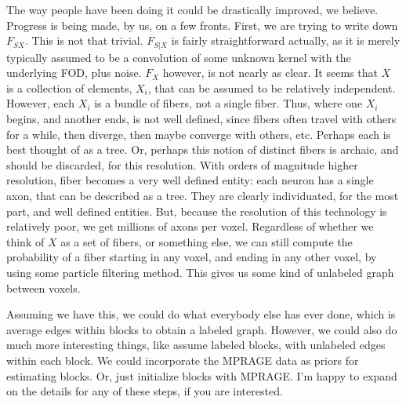 The way people have been doing it could be drastically improved, we believe.  Progress is being made, by us, on a few fronts.  First, we are trying to write down $F_{SX}$.  This is not that trivial.  $F_{S|X}$ is fairly straightforward actually, as it is merely typically assumed to be a convolution of some unknown kernel with the underlying FOD, plus noise.  $F_X$ however, is not nearly as clear.  It seems that $X$ is a collection of elements, $X_i$, that can be assumed to be relatively independent.  However, each $X_i$ is a bundle of fibers, not a single fiber.  Thus, where one $X_i$ begins, and another ends, is not well defined, since fibers often travel with others for a while, then diverge, then maybe converge with others, etc.  Perhaps each is best thought of as a tree.  Or, perhaps this notion of distinct fibers is archaic, and should be discarded, for this resolution.  With orders of magnitude higher resolution, fiber becomes a very well defined entity: each neuron has a single axon, that can be described as a tree.  They are clearly individuated, for the most part, and well defined entities.  But, because the resolution of this technology is relatively poor, we get millions of axons per voxel.  Regardless of whether we think of $X$ as a set of fibers, or something else, we can still compute the probability of a fiber starting in any voxel, and ending in any other voxel, by using some particle filtering method.  This gives us some kind of unlabeled graph between voxels.   

Assuming we have this, we could do what everybody else has ever done, which is average edges within blocks to obtain a labeled graph.  However, we could also do much more interesting things, like assume labeled blocks, with unlabeled edges within each block.  We could incorporate the MPRAGE data as priors for estimating blocks. Or, just initialize blocks with MPRAGE.  I'm happy to expand on the details for any of these steps, if you are interested.







% 





\appendix
% 
\clearpage


%

%


